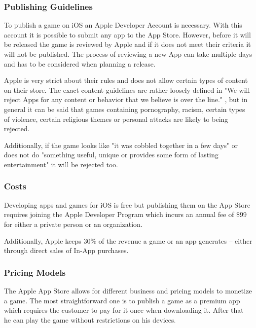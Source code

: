 \subsubsection{Publishing Guidelines}
\label{subsec:ios_guidelines}
To publish a game on iOS an Apple Developer Account is necessary. With this account it is possible to submit any app to the App Store. However, before it will be released the game is reviewed by Apple and if it does not meet their criteria it will not be published. The process of reviewing a new App can take multiple days and has to be considered when planning a release. 

Apple is very strict about their rules and does not allow certain types of content on their store. The exact content guidelines are rather loosely defined in "We will reject Apps for any content or behavior that we believe is over the line." \citep{apple_app_2016}, but in general it can be said that games containing pornography, racism, certain types of violence, certain religious themes or personal attacks are likely to being rejected.

Additionally, if the game looks like "it was cobbled together in a few days" \citep{apple_app_2016} or does not do "something useful, unique or provides some form of lasting entertainment" \citep{apple_app_2016} it will be rejected too.

\subsubsection{Costs}
\label{subsec:ios_costs}
Developing apps and games for iOS is free but publishing them on the App Store requires joining the Apple Developer Program which incurs an annual fee of \$99 for either a private person or an organization.\citep{apple_choosing_2016}

Additionally, Apple keeps 30\% of the revenue a game or an app generates – either through direct sales of In-App purchases. \citep{apple_apple_2016}

\subsubsection{Pricing Models}
\label{subsec:ios_pricing_models}
The Apple App Store allows for different business and pricing models to monetize a game. The most straightforward one is to publish a game as a premium app which requires the customer to pay for it once when downloading it. After that he can play the game without restrictions on his devices.


